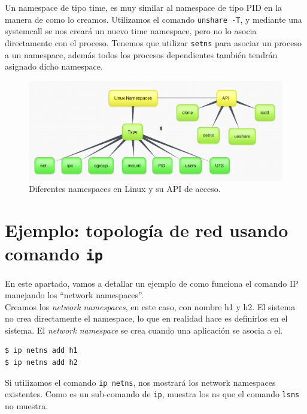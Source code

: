 \documentclass[a4paper, oneside, 12pt]{book}
\begin{document}
	\par \noindent Un namespace de tipo time, es muy similar al namespace de tipo PID en la manera de como lo creamos. Utilizamos el comando \texttt{unshare -T}, y mediante una systemcall se nos creará un nuevo time namespace, pero no lo asocia directamente con el proceso. Tenemos que utilizar \texttt{setns} para asociar un proceso a un namespace, además todos los procesos dependientes también tendrán asignado dicho namespace. 
	
	\vspace{80px}
	
	\begin{figure}[h!]
		\begin{center}
			\includegraphics[width=1\textwidth]{img/linux-namespace1.png}
			\caption{Diferentes namespaces en Linux y su API de acceso.}
			\label{img: linux namespaces api}
		\end{center}
	\end{figure}
	
	\pagebreak
	
	\section[Ejemplo: topología de red con \texttt{ip}]{Ejemplo: topología de red usando comando \texttt{ip}}
	\noindent En este apartado, vamos a detallar un ejemplo de como funciona el comando IP manejando los ``network namespaces''.\\
	
	\noindent Creamos los \textit{network namespaces}, en este caso, con nombre h1 y h2. El sistema no crea directamente el namespace, lo que en realidad hace es definirlos en el sistema. El \textit{network namespace} se crea cuando una aplicación se asocia a el.
	\begin{verbatim}
$ ip netns add h1
$ ip netns add h2
	\end{verbatim}

	\noindent Si utilizamos el comando \texttt{ip netns}, nos mostrará los network namespaces existentes. Como es un sub-comando de \texttt{ip}, muestra los ns que el comando \texttt{lsns} no muestra. \\
	
\end{document}
